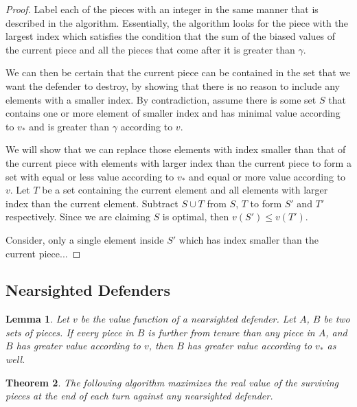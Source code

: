 \documentclass{article}
\theoremstyle{plain}
\newtheorem{thm}{Theorem}[section]
\newtheorem{lem}[thm]{Lemma}
\theoremstyle{definition}
\theoremstyle{remark}
\begin{document}
\begin{proof}
	Label each of the pieces with an integer in the same manner that is described in the algorithm. Essentially, the algorithm looks for the piece with the largest index which satisfies the condition that the sum of the biased values of the current piece and all the pieces that come after it is greater than $\gamma$. 
	
	We can then be certain that the current piece can be contained in the set that we want the defender to destroy, by showing that there is no reason to include any elements with a smaller index. By contradiction, assume there is some set $S$ that contains one or more element of smaller index and has minimal value according to $v_{*}$ and is greater than $\gamma$ according to $v$. 
	
	We will show that we can replace those elements with index smaller than that of the current piece with elements with larger index than the current piece to form a set with equal or less value according to $v_{*}$ and equal or more value according to $v$. Let $T$ be a set containing the current element and all elements with larger index than the current element. Subtract $S \cup T$ from $S$, $T$ to form $S'$ and $T'$ respectively. Since we are claiming $S$ is optimal, then $v(S') \le  v(T')$.
	
	Consider, only a single element inside $S'$ which has index smaller than the current piece...
\end{proof}

\newpage

\subsection{Nearsighted Defenders}

\begin{lem}
	Let $v$ be the value function of a nearsighted defender. Let $A$, $B$ be two sets of pieces. If every piece in $B$ is further from tenure than any piece in $A$, and $B$ has greater value according to $v$, then $B$ has greater value according to $v_{*}$ as well.
\end{lem}

\begin{thm}
	The following algorithm maximizes the real value of the surviving pieces at the end of each turn against any nearsighted defender.
\end{thm}
\end{document}
